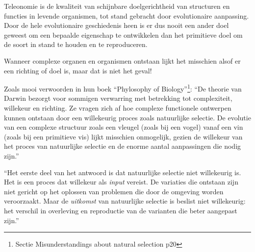 \documentclass[
  11pt,
]{book}
\begin{document}
Teleonomie is de kwaliteit van schijnbare doelgerichtheid van structuren en functies in levende organismen, tot stand gebracht door evolutionaire aanpassing. Door de hele evolutionaire geschiedenis heen is er dus nooit een ander doel geweest om een bepaalde eigenschap te ontwikkelen dan het primitieve doel om de soort in stand te houden en te reproduceren.

Wanneer complexe organen en organismen ontstaan lijkt het misschien alsof er een richting of doel is, maar dat is niet het geval!

Zoals \citet{rosenberg2008} mooi verwoorden in hun boek ``Phylosophy of Biology''\footnote{Sectie Misunderstandings about natural selection p20}: ``De theorie van Darwin bezorgt voor sommigen verwarring met betrekking tot complexiteit, willekeur en richting. Ze vragen zich af hoe complexe functionele ontwerpen kunnen ontstaan door een willekeurig proces zoals natuurlijke selectie. De evolutie van een complexe structuur zoals een vleugel (zoals bij een vogel) vanaf een vin (zoals bij een primitieve vis) lijkt misschien onmogelijk, gezien de willekeur van het proces van natuurlijke selectie en de enorme aantal aanpassingen die nodig zijn.''

``Het eerste deel van het antwoord is dat natuurlijke selectie niet willekeurig is. Het is een proces dat willekeur als \emph{input} vereist. De variaties die ontstaan zijn niet gericht op het oplossen van problemen die door de omgeving worden veroorzaakt. Maar de \emph{uitkomst} van natuurlijke selectie is beslist niet willekeurig: het verschil in overleving en reproductie van de varianten die beter aangepast zijn.''
\end{document}
